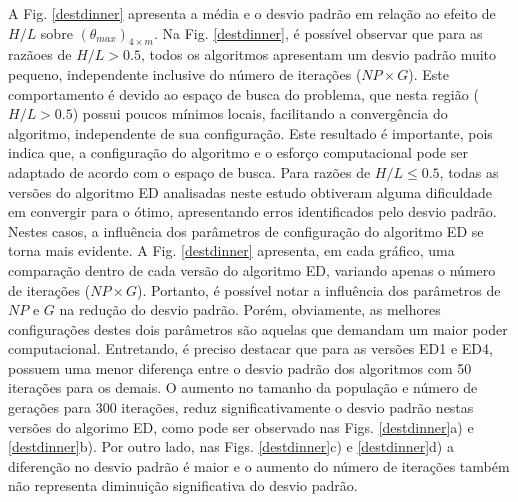 \documentclass[12pt,A4,A4pt]{article}
\begin{document}
A Fig. \ref{destdinner} apresenta a média e o desvio padrão em relação ao efeito de $H/L$ sobre $({\theta}_{max})_{4\times m}$. Na Fig. \ref{destdinner}, é possível observar que para as razãoes de $H/L>0.5$, todos os algoritmos apresentam um desvio padrão muito pequeno, independente inclusive do número de iterações ($NP \times G$). Este comportamento é devido ao espaço de busca do problema, que nesta região ($H/L>0.5$) possui poucos mínimos locais, facilitando a convergência do algoritmo, independente de sua configuração. Este resultado é importante, pois indica que, a configuração do algoritmo e o esforço computacional pode ser adaptado de acordo com o espaço de busca. 
Para razões de $H/L\leqslant0.5$, todas as versões do algoritmo ED analisadas neste estudo obtiveram alguma dificuldade em convergir para o ótimo, apresentando erros identificados pelo desvio padrão. Nestes casos, a influência dos parâmetros de configuração do algoritmo ED se torna mais evidente. A Fig. \ref{destdinner} apresenta, em cada gráfico, uma comparação dentro de cada versão do algoritmo ED, variando apenas o número de iterações ($NP \times G$). Portanto, é possível notar a influência dos parâmetros de $NP$ e $G$ na redução do desvio padrão. Porém, obviamente, as melhores configurações destes dois parâmetros são aquelas que demandam um maior poder computacional. Entretando, é preciso destacar que para as versões ED1 e ED4, possuem uma menor diferença entre o desvio padrão dos algoritmos com 50 iterações para os demais. O aumento no tamanho da população e número de gerações para 300 iterações, reduz significativamente o desvio padrão nestas versões do algorimo ED, como pode ser observado nas Figs. \ref{destdinner}a) e \ref{destdinner}b). Por outro lado, nas Figs. \ref{destdinner}c) e \ref{destdinner}d) a diferenção no desvio padrão é maior e o aumento do número de iterações também não representa diminuição significativa do desvio padrão.
\end{document}
